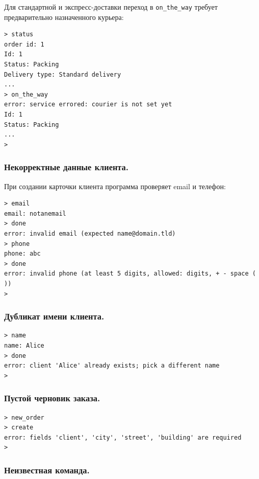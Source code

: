 \documentclass[12pt]{extarticle}
\renewcommand{\baselinestretch}{1.5}
\newcommand{\cmd}[1]{\texttt{#1}}
\begin{document}
Для стандартной и экспресс-доставки переход в
\cmd{on\_the\_way} требует предварительно назначенного курьера:
\renewcommand{\baselinestretch}{1}
\begin{lstlisting}
> status
order id: 1
Id: 1
Status: Packing
Delivery type: Standard delivery
...
> on_the_way
error: service errored: courier is not set yet
Id: 1
Status: Packing
...
>
\end{lstlisting}
\renewcommand{\baselinestretch}{1.5}

\subsubsection*{Некорректные данные клиента.}

При создании карточки клиента программа проверяет email и телефон:

\renewcommand{\baselinestretch}{1}
\begin{lstlisting}
> email
email: notanemail
> done
error: invalid email (expected name@domain.tld)
> phone
phone: abc
> done
error: invalid phone (at least 5 digits, allowed: digits, + - space ( ))
>
\end{lstlisting}
\renewcommand{\baselinestretch}{1.5}

\subsubsection*{Дубликат имени клиента.}

\renewcommand{\baselinestretch}{1}
\begin{lstlisting}
> name
name: Alice
> done
error: client 'Alice' already exists; pick a different name
>
\end{lstlisting}
\renewcommand{\baselinestretch}{1.5}

\subsubsection*{Пустой черновик заказа.}

\renewcommand{\baselinestretch}{1}
\begin{lstlisting}
> new_order
> create
error: fields 'client', 'city', 'street', 'building' are required
>
\end{lstlisting}
\renewcommand{\baselinestretch}{1.5}

\subsubsection*{Неизвестная команда.}
\end{document}
